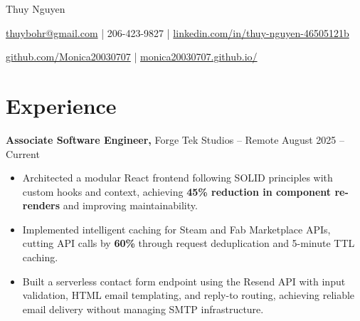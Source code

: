 \documentclass[11pt]{article}       %
\begin{document}
\centerline{\Huge Thuy Nguyen}

\vspace{5pt}

\centerline{\href{mailto:thuybohr@gmail.com}{thuybohr@gmail.com} | 206-423-9827 |
\href{https://www.linkedin.com/in/thuy-nguyen-46505121b/}{linkedin.com/in/thuy-nguyen-46505121b}}

\centerline{\href{https://github.com/Monica20030707}{github.com/Monica20030707} |
\href{https://monica20030707.github.io/}{monica20030707.github.io/}}

\vspace{-9pt}

\section*{Experience}

\textbf{Associate Software Engineer,} {Forge Tek Studios} -- Remote \hfill August 2025 -- Current
\vspace{-9pt}
\begin{itemize}
  \item Architected a modular React frontend following SOLID principles with custom hooks and context, achieving \textbf{45\% reduction in component re-renders} and improving maintainability.
  \item Implemented intelligent caching for Steam and Fab Marketplace APIs, cutting API calls by \textbf{60\%} through request deduplication and 5-minute TTL caching.
  \item Built a serverless contact form endpoint using the Resend API with input validation, HTML email templating, and reply-to routing, achieving reliable email delivery without managing SMTP infrastructure.
\end{itemize}
\end{document}
